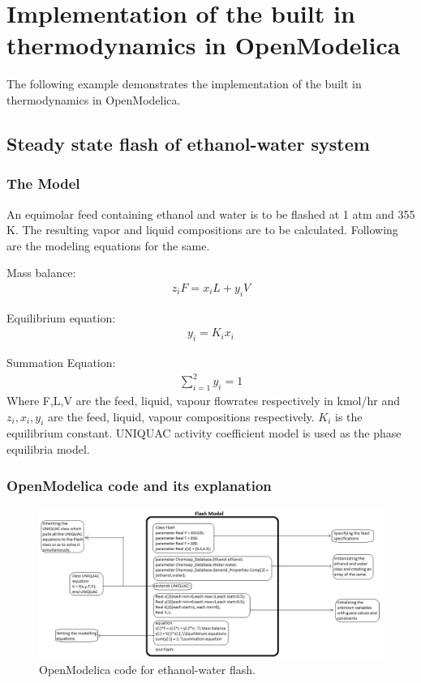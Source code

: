 \documentclass[12pt]{report}
\begin{document}
\chapter{Implementation of the built in thermodynamics in OpenModelica}
The following example demonstrates the implementation of the built in thermodynamics in OpenModelica.

\section{Steady state flash of ethanol-water system}
\subsection{The Model}
An equimolar feed containing ethanol and water is to be flashed at 1 atm and 355 K. The resulting vapor and liquid compositions are to be calculated. Following are the modeling equations for the same. 

Mass balance: \\
\begin{gather*}
z_iF = x_iL + y_iV
\end{gather*}

Equilibrium equation:
\begin{gather*}
y_i = K_ix_i 
\end{gather*}

Summation Equation: \\
\begin{gather*}
\sum_{i=1}^2y_i = 1
\end{gather*}   
Where F,L,V are the feed, liquid, vapour flowrates respectively in kmol/hr and $z_i,x_i,y_i$  are the feed, liquid, vapour compositions respectively. $K_i$ is the equilibrium constant. UNIQUAC activity coefficient model is used as the phase equilibria model. 
 
\subsection{OpenModelica code and its explanation}

\begin{figure}
\centering
\includegraphics[width=1.2\linewidth]{omcode}
\caption{OpenModelica code for ethanol-water flash.}
\label{omcode}
\end{figure}
\end{document}

